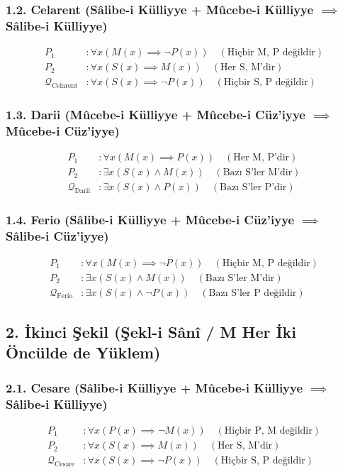 \documentclass[11pt, a4paper]{article}
\begin{document}
\subsubsection{1.2. Celarent (Sâlibe-i Külliyye + Mûcebe-i Külliyye $\implies$ Sâlibe-i Külliyye)}
\begin{align}
P_1 &: \forall x (M(x) \implies \neg P(x)) \quad (\text{Hiçbir M, P değildir}) \\
P_2 &: \forall x (S(x) \implies M(x)) \quad (\text{Her S, M'dir}) \\
\mathcal{Q}_{\text{Celarent}} &: \forall x (S(x) \implies \neg P(x)) \quad (\text{Hiçbir S, P değildir})
\end{align}

\subsubsection{1.3. Darii (Mûcebe-i Külliyye + Mûcebe-i Cüz'iyye $\implies$ Mûcebe-i Cüz'iyye)}
\begin{align}
P_1 &: \forall x (M(x) \implies P(x)) \quad (\text{Her M, P'dir}) \\
P_2 &: \exists x (S(x) \land M(x)) \quad (\text{Bazı S'ler M'dir}) \\
\mathcal{Q}_{\text{Darii}} &: \exists x (S(x) \land P(x)) \quad (\text{Bazı S'ler P'dir})
\end{align}

\subsubsection{1.4. Ferio (Sâlibe-i Külliyye + Mûcebe-i Cüz'iyye $\implies$ Sâlibe-i Cüz'iyye)}
\begin{align}
P_1 &: \forall x (M(x) \implies \neg P(x)) \quad (\text{Hiçbir M, P değildir}) \\
P_2 &: \exists x (S(x) \land M(x)) \quad (\text{Bazı S'ler M'dir}) \\
\mathcal{Q}_{\text{Ferio}} &: \exists x (S(x) \land \neg P(x)) \quad (\text{Bazı S'ler P değildir})
\end{align}

\subsection{2. İkinci Şekil (Şekl-i Sânî / M Her İki Öncülde de Yüklem)}

\subsubsection{2.1. Cesare (Sâlibe-i Külliyye + Mûcebe-i Külliyye $\implies$ Sâlibe-i Külliyye)}
\begin{align}
P_1 &: \forall x (P(x) \implies \neg M(x)) \quad (\text{Hiçbir P, M değildir}) \\
P_2 &: \forall x (S(x) \implies M(x)) \quad (\text{Her S, M'dir}) \\
\mathcal{Q}_{\text{Cesare}} &: \forall x (S(x) \implies \neg P(x)) \quad (\text{Hiçbir S, P değildir})
\end{align}
\end{document}
